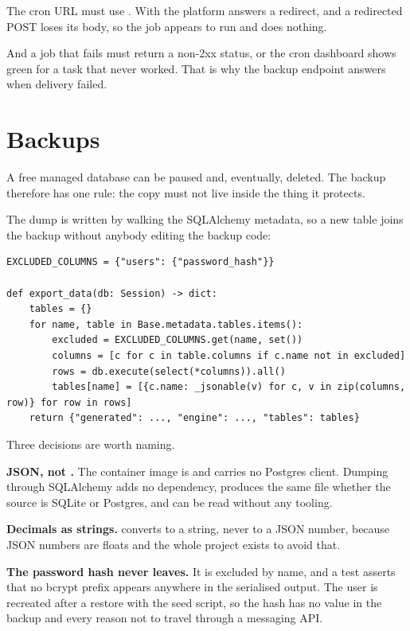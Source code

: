 \begin{pitfall}
The cron URL must use . With  the platform answers
a redirect, and a redirected POST loses its body, so the job appears to run and
does nothing.

And a job that fails must return a non-2xx status, or the cron dashboard shows
green for a task that never worked. That is why the backup endpoint answers
 when delivery failed.
\end{pitfall}

\section{Backups}

A free managed database can be paused and, eventually, deleted. The backup
therefore has one rule: the copy must not live inside the thing it protects.

The dump is written by walking the SQLAlchemy metadata, so a new table joins the
backup without anybody editing the backup code:

\begin{lstlisting}[style=py]
EXCLUDED_COLUMNS = {"users": {"password_hash"}}

def export_data(db: Session) -> dict:
    tables = {}
    for name, table in Base.metadata.tables.items():
        excluded = EXCLUDED_COLUMNS.get(name, set())
        columns = [c for c in table.columns if c.name not in excluded]
        rows = db.execute(select(*columns)).all()
        tables[name] = [{c.name: _jsonable(v) for c, v in zip(columns, row)} for row in rows]
    return {"generated": ..., "engine": ..., "tables": tables}
\end{lstlisting}

Three decisions are worth naming.

\textbf{JSON, not .} The container image is 
and carries no Postgres client. Dumping through SQLAlchemy adds no dependency,
produces the same file whether the source is SQLite or Postgres, and can be read
without any tooling.

\textbf{Decimals as strings.}  converts  to a
string, never to a JSON number, because JSON numbers are floats and the whole
project exists to avoid that.

\textbf{The password hash never leaves.} It is excluded by name, and a test
asserts that no bcrypt prefix appears anywhere in the serialised output. The
user is recreated after a restore with the seed script, so the hash has no value
in the backup and every reason not to travel through a messaging API.

